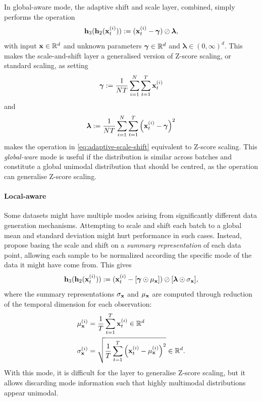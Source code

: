 \documentclass{statsmsc}
\begin{document}
In global-aware mode, the adaptive shift and scale layer, combined, simply performs the operation
\begin{equation}\label{eq:adaptive-scale-shift}
    \mathbf{h}_3(\mathbf{h}_2(\mathbf{x}_t^{(i)})):=(\mathbf{x}_t^{(i)} - \bm\gamma) \oslash \bm\lambda,
\end{equation}
with input $\mathbf{x} \in \mathbb{R}^d$ and unknown parameters $\bm\gamma \in \mathbb{R}^d$ and $\bm\lambda \in (0,\infty)^d$.
This makes the scale-and-shift layer a generalised version of
Z-score scaling, or standard scaling, as setting
\begin{equation}
    \bm\gamma:=\frac{1}{N T}  \sum^{N}_{i=1} \sum^{T}_{t=1} \mathbf{x}_{t}^{(i)}
\end{equation}
and
\begin{equation}
    \bm\lambda:=\frac{1}{N T} \sum^{N}_{i=1} \sum^{T}_{t=1} \left(\mathbf{x}_{t}^{(i)}- \bm\gamma\right)^2
\end{equation}
makes the operation in \cref{eq:adaptive-scale-shift} equivalent to Z-score scaling.
This \textit{global-ware} mode is useful if the distribution is similar across batches
and constitute a global unimodal distribution that should be centred, as the operation can generalise Z-score scaling.

\paragraph{Local-aware}%
\label{par:Local-aware}

Some datasets might have multiple modes arising from significantly different
data generation mechanisms. Attempting to scale and shift each batch to a global mean and
standard deviation might hurt performance in such cases. Instead, \citeauthor{dain} propose
basing the scale and shift on a \textit{summary representation} of each data point, allowing
each sample to be normalized according the specific mode  of the data it might have come from.
This gives
\begin{equation}
    \mathbf{h}_3(\mathbf{h}_2(\mathbf{x}_t^{(i)})):=  (\mathbf{x}_t^{(i)} - [\bm\gamma \odot \mu_{\mathbf{x}}]) \oslash [\bm\lambda \odot \sigma_{\mathbf{x}}],
\end{equation}
where the summary representations $\sigma_{\mathbf{x}}$ and $\mu_{\mathbf{x}}$ are computed through reduction
of the temporal dimension for each observation:
\begin{align}
    \mu_{\mathbf{x}}^{(i)}&=\frac{1}{T} \sum^{T}_{t=1} \mathbf{x}^{(i)}_t \in \mathbb{R}^d \\
    \sigma_{\mathbf{x}}^{(i)}&=\sqrt{\frac{1}{T}  \sum^{T}_{t=1} \left(\mathbf{x}^{(i)}_t- \mu_{\mathbf{x}}^{(i)} \right)^2} \in \mathbb{R}^d.
\end{align}
With this mode, it is difficult for the layer to generalise Z-score scaling, but it allows
discarding mode information such that highly multimodal distributions appear unimodal.
\end{document}
